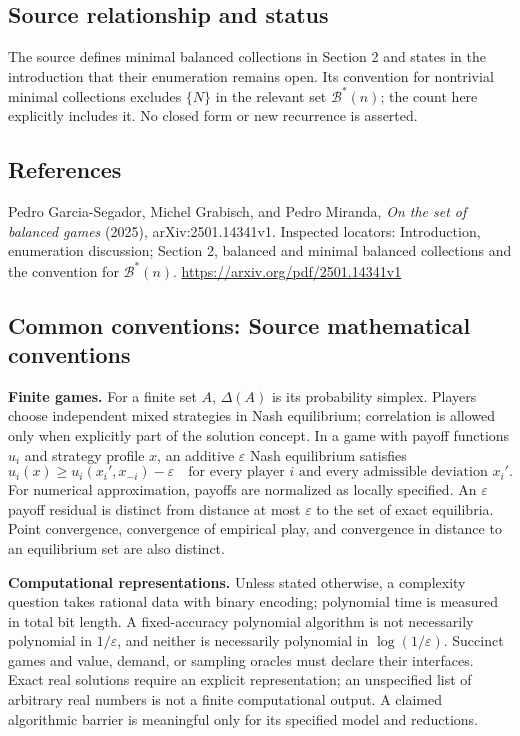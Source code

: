 \documentclass[11pt,a4paper]{article}
\begin{document}
\subsection*{Source relationship and status}
The source defines minimal balanced collections in Section 2 and states in the introduction that their enumeration remains open. Its convention for nontrivial minimal collections excludes $\{N\}$ in the relevant set $\mathcal B^*(n)$; the count here explicitly includes it. No closed form or new recurrence is asserted.

\subsection*{References}
\begingroup\footnotesize\raggedright
\noindent [S1] Pedro Garcia-Segador, Michel Grabisch, and Pedro Miranda, \emph{On the set of balanced games} (2025), arXiv:2501.14341v1. Inspected locators: Introduction, enumeration discussion; Section 2, balanced and minimal balanced collections and the convention for $\mathcal B^*(n)$.
\url{https://arxiv.org/pdf/2501.14341v1}
\par\endgroup

\subsection*{Common conventions: Source mathematical conventions}

\textbf{Finite games.} For a finite set $A$, $\Delta(A)$ is its probability
simplex. Players choose independent mixed strategies in Nash equilibrium;
correlation is allowed only when explicitly part of the solution concept.
In a game with payoff functions $u_i$ and strategy profile $x$, an additive
$\varepsilon$ Nash equilibrium satisfies
\[
 u_i(x)\geq u_i(x_i',x_{-i})-\varepsilon
 \quad\text{for every player $i$ and every admissible deviation $x_i'$}.
\]
For numerical approximation, payoffs are normalized as locally specified.
An $\varepsilon$ payoff residual is distinct from distance at most
$\varepsilon$ to the set of exact equilibria. Point convergence, convergence
of empirical play, and convergence in distance to an equilibrium set are
also distinct.

\textbf{Computational representations.} Unless stated otherwise, a complexity
question takes rational data with binary encoding; polynomial time is measured
in total bit length. A fixed-accuracy polynomial algorithm is not necessarily
polynomial in $1/\varepsilon$, and neither is necessarily polynomial in
$\log(1/\varepsilon)$. Succinct games and value, demand, or sampling oracles
must declare their interfaces. Exact real solutions require an explicit
representation; an unspecified list of arbitrary real numbers is not a
finite computational output. A claimed algorithmic barrier is meaningful
only for its specified model and reductions.
\end{document}
